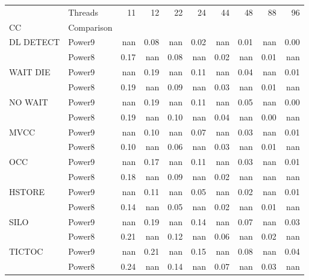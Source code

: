 \begin{tabular}{llrrrrrrrr}
\toprule
       & Threads &   11 &   12 &   22 &   24 &   44 &   48 &   88 &   96 \\
CC & Comparison &      &      &      &      &      &      &      &      \\
\midrule
DL DETECT & Power9 &  nan & 0.08 &  nan & 0.02 &  nan & 0.01 &  nan & 0.00 \\
       & Power8 & 0.17 &  nan & 0.08 &  nan & 0.02 &  nan & 0.01 &  nan \\
WAIT DIE & Power9 &  nan & 0.19 &  nan & 0.11 &  nan & 0.04 &  nan & 0.01 \\
       & Power8 & 0.19 &  nan & 0.09 &  nan & 0.03 &  nan & 0.01 &  nan \\
NO WAIT & Power9 &  nan & 0.19 &  nan & 0.11 &  nan & 0.05 &  nan & 0.00 \\
       & Power8 & 0.19 &  nan & 0.10 &  nan & 0.04 &  nan & 0.00 &  nan \\
MVCC & Power9 &  nan & 0.10 &  nan & 0.07 &  nan & 0.03 &  nan & 0.01 \\
       & Power8 & 0.10 &  nan & 0.06 &  nan & 0.03 &  nan & 0.01 &  nan \\
OCC & Power9 &  nan & 0.17 &  nan & 0.11 &  nan & 0.03 &  nan & 0.01 \\
       & Power8 & 0.18 &  nan & 0.09 &  nan & 0.02 &  nan &  nan &  nan \\
HSTORE & Power9 &  nan & 0.11 &  nan & 0.05 &  nan & 0.02 &  nan & 0.01 \\
       & Power8 & 0.14 &  nan & 0.05 &  nan & 0.02 &  nan & 0.01 &  nan \\
SILO & Power9 &  nan & 0.19 &  nan & 0.14 &  nan & 0.07 &  nan & 0.03 \\
       & Power8 & 0.21 &  nan & 0.12 &  nan & 0.06 &  nan & 0.02 &  nan \\
TICTOC & Power9 &  nan & 0.21 &  nan & 0.15 &  nan & 0.08 &  nan & 0.04 \\
       & Power8 & 0.24 &  nan & 0.14 &  nan & 0.07 &  nan & 0.03 &  nan \\
\bottomrule
\end{tabular}
